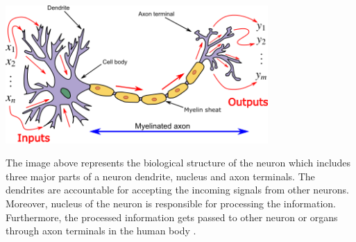 \vspace{3mm}
\begin{center}
  \includegraphics[width=10cm]{Images/neuron.png}
\end{center}

The image above represents the biological structure of the neuron which includes three major parts of a neuron dendrite, nucleus and axon terminals.
The dendrites are accountable for accepting the incoming signals from other neurons. 
Moreover, nucleus of the neuron is responsible for processing the information. 
Furthermore, the processed information gets passed to other neuron or organs through axon terminals 
in the human body \citep{AGATONOVICKUSTRIN2000717}. 
